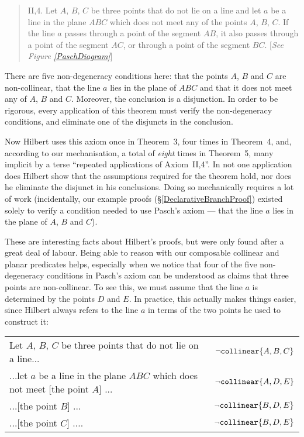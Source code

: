 \begin{quote}II,4. Let $A$, $B$, $C$ be three points that do not lie on a line and let $a$ be a line in the plane $ABC$ which does not meet any of the points $A$, $B$, $C$. If the line $a$ passes through a point of the segment $AB$, it also passes through a point of the segment $AC$, or through a point of the segment $BC$. [\emph{See Figure \ref{PaschDiagram}}]\end{quote}\label{PaschAxiom}

There are five non-degeneracy conditions here: that the points $A$, $B$ and $C$ are non-collinear, that the line $a$ lies in the plane of $ABC$ and that it does not meet any of $A$, $B$ and $C$. Moreover, the conclusion is a disjunction. In order to be rigorous, every application of this theorem must verify the non-degeneracy conditions, and eliminate one of the disjuncts in the conclusion. 

Now Hilbert uses this axiom once in Theorem~3, four times in Theorem~4, and, according to our mechanisation, a total of \emph{eight} times in Theorem~5, many implicit by a terse ``repeated applications of Axiom~II,4''. In not one application does Hilbert show that the assumptions required for the theorem hold, nor does he eliminate the disjunct in his conclusions. Doing so mechanically requires a lot of work (incidentally, our example proofs (\S\ref{DeclarativeBranchProof}) existed solely to verify a condition needed to use Pasch's axiom --- that the line $a$ lies in the plane of $A$, $B$ and $C$).

These are interesting facts about Hilbert's proofs, but were only found after a great deal of labour. Being able to reason with our composable collinear and planar predicates helps, especially when we notice that four of the five non-degeneracy conditions in Pasch's axiom can be understood as claims that three points are non-collinear. To see this, we must assume that the line $a$ is determined by the points $D$ and $E$. In practice, this actually makes things easier, since Hilbert always refers to the line $a$ in terms of the two points he used to construct it:

\begin{tabular}{p{5cm}r}
  Let $A$, $B$, $C$ be three points that do not lie on a line... & $\neg\texttt{collinear}\{A,B,C\}$\\

...let $a$ be a line in the plane $ABC$ which does not meet [the point $A$] ... & $\neg\texttt{collinear}\{A,D,E\}$ \\

...[the point $B$] ... & $\neg\texttt{collinear}\{B,D,E\}$ \\

...[the point $C$] .... & $\neg\texttt{collinear}\{B,D,E\}$
\end{tabular}


